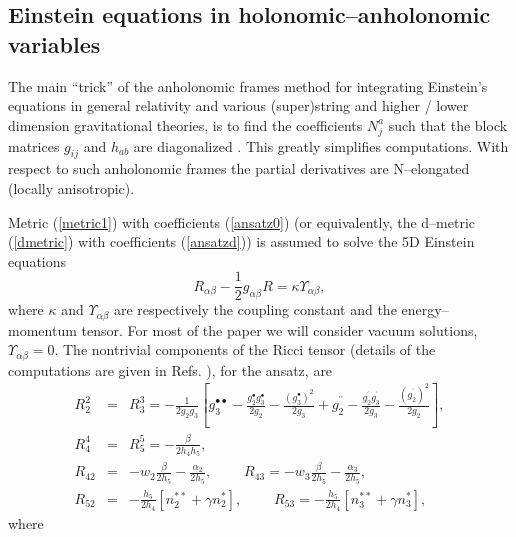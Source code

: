 \documentclass[a4paper,preprint,prabib,aps]{revtex4}
\begin{document}
\subsection{Einstein equations in holonomic--anholonomic variables}

The main ``trick'' of the anholonomic frames method for integrating
Einstein's equations in general relativity and various (super)string and
higher / lower dimension gravitational theories, is to find the coefficients
$N_j^a$ such that the block matrices $g_{ij}$ and $h_{ab}$ are diagonalized
\cite{vst,v}. This greatly simplifies computations. With respect to such
anholonomic frames the partial derivatives are N--elongated (locally
anisotropic).

Metric (\ref{metric1}) with coefficients (\ref{ansatz0}) (or equivalently,
the d--metric (\ref{dmetric}) with coefficients (\ref{ansatzd})) is assumed
to solve the 5D Einstein equations
\begin{equation}
R_{\alpha \beta }-\frac{1}{2}g_{\alpha \beta }R=\kappa \Upsilon _{\alpha
\beta },  \label{5einstein}
\end{equation}
where $\kappa $ and $\Upsilon _{\alpha \beta }$ are respectively
the coupling constant and the energy--momentum tensor. For most
of the paper we will consider vacuum solutions, $\Upsilon _{\alpha
\beta} = 0$. The nontrivial components of the Ricci tensor (details of the
computations are given in Refs. \cite {vsbd,v}), for the ansatz,
are
\begin{eqnarray}
R_{2}^{2} &=&R_{3}^{3}=-\frac{1}{2g_{2}g_{3}}\left[ g_{3}^{\bullet \bullet }-%
\frac{g_{2}^{\bullet }g_{3}^{\bullet }}{2g_{2}}-\frac{(g_{3}^{\bullet })^{2}%
}{2g_{3}}+g_{2}^{^{\prime \prime }}-\frac{g_{2}^{^{\prime }}g_{3}^{^{\prime
}}}{2g_{3}}-\frac{(g_{2}^{^{\prime }})^{2}}{2g_{2}}\right] ,  \label{ricci1a}
\\
R_{4}^{4} &=&R_{5}^{5}=-\frac{\beta }{2h_{4}h_{5}},  \label{ricci1b} \\
R_{42} &=&-w_{2}\frac{\beta }{2h_{5}}-\frac{\alpha _{2}}{2h_{5}},\qquad
\;R_{43}=-w_{3}\frac{\beta }{2h_{5}}-\frac{\alpha _{3}}{2h_{5}},
\label{ricci1c} \\
R_{52} &=&-\frac{h_{5}}{2h_{4}}\left[ n_{2}^{\ast \ast }+\gamma n_{2}^{\ast }%
\right] ,\qquad \;R_{53}=-\frac{h_{5}}{2h_{4}}\left[ n_{3}^{\ast \ast
}+\gamma n_{3}^{\ast }\right] ,  \label{ricci1d}
\end{eqnarray}
where
\end{document}
